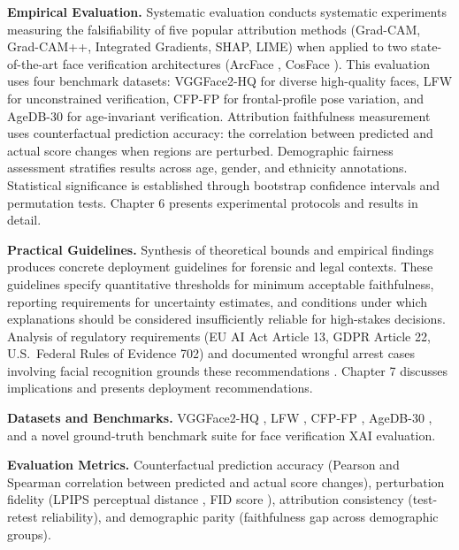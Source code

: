 \textbf{Empirical Evaluation.} Systematic evaluation conducts systematic experiments measuring the falsifiability of five popular attribution methods (Grad-CAM, Grad-CAM++, Integrated Gradients, SHAP, LIME) when applied to two state-of-the-art face verification architectures (ArcFace \cite{deng2019arcface}, CosFace \cite{wang2018cosface}). This evaluation uses four benchmark datasets: VGGFace2-HQ \cite{cao2018vggface2} for diverse high-quality faces, LFW \cite{huang2007lfw} for unconstrained verification, CFP-FP \cite{sengupta2016cfp} for frontal-profile pose variation, and AgeDB-30 \cite{moschoglou2017agedb} for age-invariant verification. Attribution faithfulness measurement uses counterfactual prediction accuracy: the correlation between predicted and actual score changes when regions are perturbed. Demographic fairness assessment stratifies results across age, gender, and ethnicity annotations. Statistical significance is established through bootstrap confidence intervals and permutation tests. Chapter 6 presents experimental protocols and results in detail.

\textbf{Practical Guidelines.} Synthesis of theoretical bounds and empirical findings produces concrete deployment guidelines for forensic and legal contexts. These guidelines specify quantitative thresholds for minimum acceptable faithfulness, reporting requirements for uncertainty estimates, and conditions under which explanations should be considered insufficiently reliable for high-stakes decisions. Analysis of regulatory requirements (EU AI Act Article 13, GDPR Article 22, U.S.\ Federal Rules of Evidence 702) and documented wrongful arrest cases involving facial recognition grounds these recommendations \cite{grother2019frvt,hill2020detroit,hill2023pregnant,euaiact2024,gdpr2016,fed702}. Chapter 7 discusses implications and presents deployment recommendations.

\textbf{Datasets and Benchmarks.} VGGFace2-HQ \cite{cao2018vggface2}, LFW \cite{huang2007lfw}, CFP-FP \cite{sengupta2016cfp}, AgeDB-30 \cite{moschoglou2017agedb}, and a novel ground-truth benchmark suite for face verification XAI evaluation.

\textbf{Evaluation Metrics.} Counterfactual prediction accuracy (Pearson and Spearman correlation between predicted and actual score changes), perturbation fidelity (LPIPS perceptual distance \cite{zhang2018lpips}, FID score \cite{heusel2017fid}), attribution consistency (test-retest reliability), and demographic parity (faithfulness gap across demographic groups).

